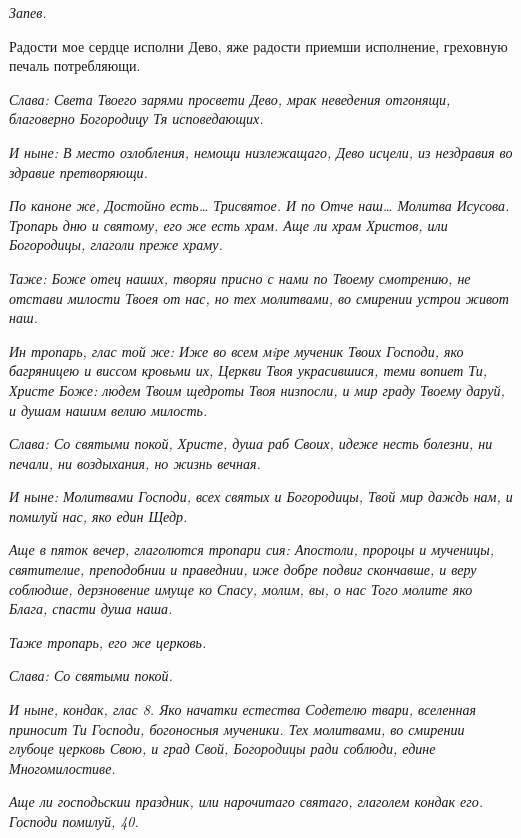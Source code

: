  \itshape Запев.\normalfont{}


   Радости мое сердце исполни Дево, яже радости приемши исполнение,
греховную печаль потребляющи.


 \itshape Слава:\normalfont{} Света Твоего зарями просвети Дево, мрак неведения отгонящи,
благоверно Богородицу Тя исповедающих.


 \itshape И ныне:\normalfont{} В место озлобления, немощи низлежащаго, Дево исцели, из
нездравия во здравие претворяющи.


 \itshape По каноне же,\normalfont{} Достойно есть… \itshape Трисвятое\normalfont{}. \itshape И по\normalfont{} Отче наш… \itshape Молитва
Исусова. Тропарь дню и святому, его же есть храм. Аще ли храм Христов,
или Богородицы, глаголи преже храму.\normalfont{}


 \itshape Таже:\normalfont{} Боже отец наших, творяи присно с нами по Твоему смотрению, не
отстави милости Твоея от нас, но тех молитвами, во смирении устрои живот
наш.


 \itshape Ин тропарь, глас той же:\normalfont{} Иже во всем мiре мученик Твоих Господи, яко
багряницею и виссом кровьми их, Церкви Твоя украсившися, теми вопиет
Ти, Христе Боже: людем Твоим щедроты Твоя низпосли, и мир граду
Твоему даруй, и душам нашим велию милость.


 \itshape Слава:\normalfont{} Со святыми покой, Христе, душа раб Своих, идеже несть болезни,
ни печали, ни воздыхания, но жизнь вечная.


 \itshape И ныне:\normalfont{} Молитвами Господи, всех святых и Богородицы, Твой мир даждь
нам, и помилуй нас, яко един Щедр.


 \itshape Аще в пяток вечер, глаголются тропари сия:\normalfont{} Апостоли, пророцы и
мученицы, святителие, преподобнии и праведнии, иже добре подвиг
скончавше, и веру соблюдше, дерзновение имуще ко Спасу, молим, вы, о нас
Того молите яко Блага, спасти душа наша.


 \itshape Таже тропарь, его же церковь.\normalfont{}


 \itshape Слава:\normalfont{} Со святыми покой.


 \itshape И ныне, кондак, глас 8.\normalfont{} Яко начатки естества Содетелю твари, вселенная
приносит Ти Господи, богоносныя мученики. Тех молитвами, во смирении
глубоце церковь Свою, и град Свой, Богородицы ради соблюди, едине
Многомилостиве.


 \itshape Аще ли господьскии праздник, или нарочитаго святаго, глаголем кондак
его.\normalfont{} Господи помилуй, \itshape 40\normalfont{}.


